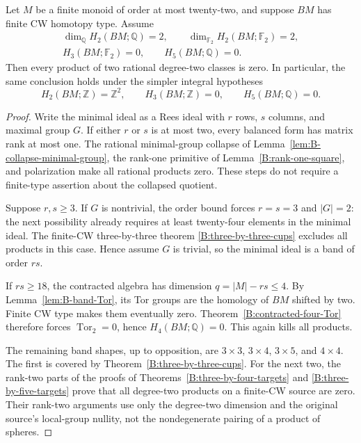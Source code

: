 \begin{theorem}
\label{B:rank-two-products-through22}
Let $M$ be a finite monoid of order at most twenty-two, and
suppose $BM$ has finite CW homotopy type. Assume
\[
 \begin{gathered}
 \dim_{\mathbb Q}H_2(BM;\mathbb Q)=2,\qquad
 \dim_{\mathbb F_2}H_2(BM;\mathbb F_2)=2,
 \\
 H_3(BM;\mathbb F_2)=0,\qquad
 H_5(BM;\mathbb Q)=0.
 \end{gathered}
\]
Then every product of two rational degree-two classes is zero.
In particular, the same conclusion holds under the simpler
integral hypotheses
\[
 H_2(BM;\mathbb Z)=\mathbb Z^2,\qquad
 H_3(BM;\mathbb Z)=0,\qquad H_5(BM;\mathbb Q)=0.
\]
\end{theorem}
\begin{proof}
Write the minimal ideal as a Rees ideal with $r$ rows, $s$
columns, and maximal group $G$. If either $r$ or $s$ is at most
two, every balanced form has matrix rank at most one. The rational
minimal-group collapse of Lemma~\ref{lem:B-collapse-minimal-group},
the rank-one primitive of Lemma~\ref{B:rank-one-square}, and
polarization make all rational products zero. These steps do not
require a finite-type assertion about the collapsed quotient.

Suppose $r,s\ge3$. If $G$ is nontrivial, the order bound forces
$r=s=3$ and $|G|=2$: the next possibility already requires at
least twenty-four elements in the minimal ideal. The finite-CW
three-by-three theorem \ref{B:three-by-three-cups} excludes all
products in this case. Hence assume $G$ is trivial, so the minimal
ideal is a band of order $rs$.

If $rs\ge18$, the contracted algebra has dimension
$q=|M|-rs\le4$. By Lemma~\ref{lem:B-band-Tor}, its Tor groups
are the homology of $BM$ shifted by two. Finite CW type makes
them eventually zero. Theorem~\ref{B:contracted-four-Tor} therefore
forces $\operatorname{Tor}_2=0$, hence $H_4(BM;\mathbb Q)=0$.
This again kills all products.

The remaining band shapes, up to opposition, are
$3\times3$, $3\times4$, $3\times5$, and $4\times4$.
The first is covered by Theorem~\ref{B:three-by-three-cups}.
For the next two, the rank-two parts of the proofs of
Theorems~\ref{B:three-by-four-targets} and
\ref{B:three-by-five-targets} prove that all degree-two products
on a finite-CW source are zero. Their rank-two arguments use
only the degree-two dimension and the original source's local-group
nullity, not the nondegenerate pairing of a product of spheres.


\end{proof}
